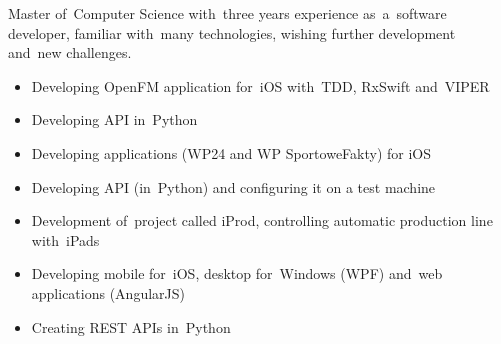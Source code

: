 \documentclass[11pt,a4paper]{article}
\begin{document}
    \bigskip


    \smallskip

    \noindent
    Master of~Computer Science with~three years experience as~a~software developer, familiar with~many
    technologies, wishing further development and~new challenges.


    \bigskip


    \smallskip

    \vspace{-0.2cm}
    \begin{itemize} \itemsep1pt \parskip0pt 
        \item Developing OpenFM application for~iOS with~TDD, RxSwift and~VIPER
        \item Developing API in~Python
    \end{itemize}
    \vspace{-0.2cm}
    \vspace{-0.2cm}
    \begin{itemize} \itemsep1pt \parskip0pt 
        \item Developing applications (WP24 and WP SportoweFakty) for iOS
        \item Developing API (in~Python) and configuring it on a test machine
    \end{itemize}
    \vspace{-0.2cm}
    \vspace{-0.2cm}
    \begin{itemize} \itemsep1pt \parskip0pt 
        \item Development of~project called iProd, controlling automatic production line with~iPads
        \item Developing mobile for~iOS, desktop for~Windows (WPF) and~web applications (AngularJS)
        \item Creating REST APIs in~Python
    \end{itemize}
\end{document}
